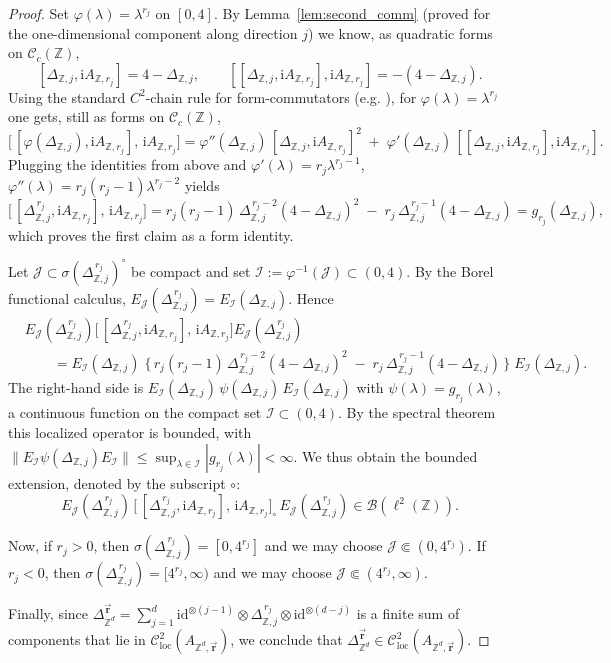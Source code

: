 \documentclass[10pt]{amsart} %
\newcommand{\Z}{{\mathbb{Z}}}
\newcommand{\1}{{\mathbb{I}}}
\newcommand{\Bc}{\mathcal{B}}
\newcommand{\Cc}{\mathcal{C}}
\newcommand{\Ic}{\mathcal{I}}
\newcommand{\Jc}{\mathcal{J}}
\numberwithin{equation}{section}
\begin{document}
\begin{proof}
Set $\varphi(\lambda)=\lambda^{r_j}$ on $[0,4]$. By Lemma~\ref{lem:second_comm} (proved for the one-dimensional
component along direction $j$) we know, as quadratic forms on $\Cc_c(\Z)$,
\[
[\Delta_{\Z,j},\mathrm{i}A_{\Z,r_j}]=4-\Delta_{\Z,j},
\qquad
[[\Delta_{\Z,j},\mathrm{i}A_{\Z,r_j}],\mathrm{i}A_{\Z,r_j}]=-(4-\Delta_{\Z,j}).
\]
Using the standard \(C^2\)-chain rule for form-commutators (e.g. \cite[Prop.~6.2.10]{ABG}),
for $\varphi(\lambda)=\lambda^{r_j}$ one gets, still as forms on $\Cc_c(\Z)$,
\[
\big[\,[\varphi(\Delta_{\Z,j}),\mathrm{i}A_{\Z,r_j}],\,\mathrm{i}A_{\Z,r_j}\big]
=\varphi''(\Delta_{\Z,j})\,[\Delta_{\Z,j},\mathrm{i}A_{\Z,r_j}]^2
\;+\;\varphi'(\Delta_{\Z,j})\,[[\Delta_{\Z,j},\mathrm{i}A_{\Z,r_j}],\mathrm{i}A_{\Z,r_j}].
\]
Plugging the identities from above and $\varphi'(\lambda)=r_j\lambda^{r_j-1}$,
$\varphi''(\lambda)=r_j(r_j-1)\lambda^{r_j-2}$ yields
\[
\big[\,[\Delta_{\Z,j}^{\,r_j},\mathrm{i}A_{\Z,r_j}],\,\mathrm{i}A_{\Z,r_j}\big]
=r_j(r_j-1)\,\Delta_{\Z,j}^{\,r_j-2}(4-\Delta_{\Z,j})^2
\;-\;r_j\,\Delta_{\Z,j}^{\,r_j-1}(4-\Delta_{\Z,j})
=g_{r_j}(\Delta_{\Z,j}),
\]
which proves the first claim as a form identity.

Let $\Jc\subset\sigma(\Delta_{\Z,j}^{\,r_j})^\circ$ be compact and set
\(\Ic:=\varphi^{-1}(\Jc)\subset(0,4)\). By the Borel functional calculus,
\(E_\Jc(\Delta_{\Z,j}^{\,r_j})=E_\Ic(\Delta_{\Z,j})\).
Hence
\[
\begin{aligned}
&E_\Jc(\Delta_{\Z,j}^{\,r_j})
\big[\,[\Delta_{\Z,j}^{\,r_j},\mathrm{i}A_{\Z,r_j}],\,\mathrm{i}A_{\Z,r_j}\big]
E_\Jc(\Delta_{\Z,j}^{\,r_j})
\\
&\qquad=E_\Ic(\Delta_{\Z,j})\;
\big\{\,r_j(r_j-1)\,\Delta_{\Z,j}^{\,r_j-2}(4-\Delta_{\Z,j})^2
\;-\;r_j\,\Delta_{\Z,j}^{\,r_j-1}(4-\Delta_{\Z,j})\,\big\}\;
E_\Ic(\Delta_{\Z,j}).
\end{aligned}
\]
The right-hand side is \(E_\Ic(\Delta_{\Z,j})\,\psi(\Delta_{\Z,j})\,E_\Ic(\Delta_{\Z,j})\) with
\(\psi(\lambda)=g_{r_j}(\lambda)\), a continuous function on the compact set \(\Ic\subset(0,4)\).
By the spectral theorem this localized operator is bounded, with
\(\|E_\Ic\psi(\Delta_{\Z,j})E_\Ic\| \le \sup_{\lambda\in\Ic}|g_{r_j}(\lambda)|<\infty\).
We thus obtain the bounded extension, denoted by the subscript \(\circ\):
\[
E_\Jc(\Delta_{\Z,j}^{\,r_j})\,
\big[\,[\Delta_{\Z,j}^{\,r_j},\mathrm{i}A_{\Z,r_j}],\,\mathrm{i}A_{\Z,r_j}\big]_{\circ}\,
E_\Jc(\Delta_{\Z,j}^{\,r_j})\in\Bc(\ell^2(\Z)).
\]


Now, if \(r_j>0\), then \(\sigma(\Delta_{\Z,j}^{\,r_j})=[0,4^{r_j}]\) and we may choose
\(\Jc\Subset(0,4^{r_j})\). If \(r_j<0\), then \(\sigma(\Delta_{\Z,j}^{\,r_j})=[4^{r_j},\infty)\) and we
may choose \(\Jc\Subset(4^{r_j},\infty)\).

Finally, since \(\Delta_{\Z^d}^{\vec{\mathbf{r}}}=\sum_{j=1}^d \mathrm{id}^{\otimes(j-1)}\otimes\Delta_{\Z,j}^{\,r_j}\otimes
\mathrm{id}^{\otimes(d-j)}\) is a finite sum of components that lie in \(\Cc^2_{\mathrm{loc}}(A_{\Z^d,\vec{\mathbf{r}}})\),
we conclude that
\(\Delta_{\Z^d}^{\vec{\mathbf{r}}}\in \Cc^2_{\mathrm{loc}}(A_{\Z^d,\vec{\mathbf{r}}})\).
\end{proof}
\end{document}
